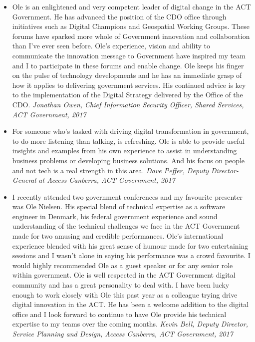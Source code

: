 \documentclass[11pt,a4paper]{article}
\begin{document}
\begin{itemize}
\item Ole is an enlightened and very competent leader of digital change in the ACT Government. He has advanced the position of the CDO office through initiatives such as Digital Champions and Geospatial Working Groups. These forums have sparked more whole of Government innovation and collaboration than I've ever seen before. Ole's experience, vision and ability to communicate the innovation message to Government have inspired my team and I to participate in these forums and enable change. Ole keeps his finger on the pulse of technology developments and he has an immediate grasp of how it applies to delivering government services. His continued advice is key to the implementation of the Digital Strategy delivered by the Office of the CDO.
\emph{Jonathan Owen, Chief Information Security Officer, Shared Services, ACT Government, 2017}

\item For someone who’s tasked with driving digital transformation in government, to do more listening than talking, is refreshing. Ole is able to provide useful insights and examples from his own experience to assist in understanding business problems or developing business solutions. And his focus on people and not tech is a real strength in this area.
\emph{Dave Peffer, Deputy Director-General at Access Canberra, ACT Government, 2017}

\item I recently attended two government conferences and my favourite presenter was Ole Nielsen. His special blend of technical expertise as a software engineer in Denmark, his federal government experience and sound understanding of the technical challenges we face in the ACT Government made for two amusing and credible performances. Ole’s international experience blended with his great sense of humour made for two entertaining sessions and I wasn’t alone in saying his performance was a crowd favourite. I would highly recommended Ole as a guest speaker or for any senior role within government. Ole is well respected in the ACT Government digital community and has a great personality to deal with. I have been lucky enough to work closely with Ole this past year as a colleague trying drive digital innovation in the ACT. He has been a welcome addition to the digital office and I look forward to continue to have Ole provide his technical expertise to my teams over the coming months.
\emph{Kevin Bell, Deputy Director, Service Planning and Design, Access Canberra, ACT Government, 2017}


\end{itemize}
\end{document}
